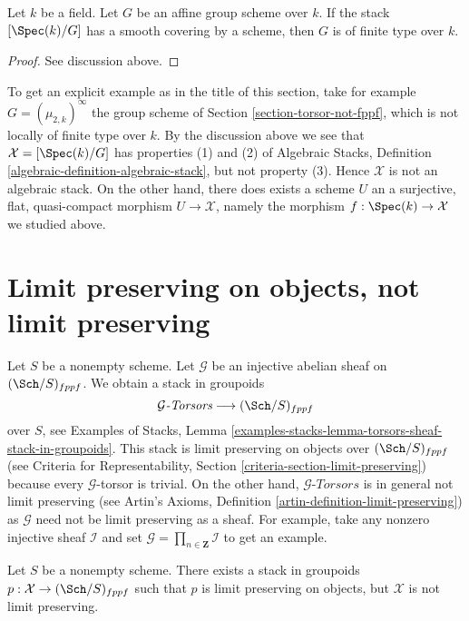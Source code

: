 \begin{lemma}
\label{lemma-BG-algebraic}
Let $k$ be a field. Let $G$ be an affine group scheme over $k$.
If the stack $[\Spec(k)/G]$ has a smooth covering by a
scheme, then $G$ is of finite type over $k$.
\end{lemma}

\begin{proof}
See discussion above.
\end{proof}

\noindent
To get an explicit example as in the title of this section, take for example
$G = (\mu_{2, k})^\infty$ the group scheme of
Section \ref{section-torsor-not-fppf}, which is not locally of finite type
over $k$. By the discussion above we see that
$\mathcal{X} = [\Spec(k)/G]$ has properties (1) and (2) of
Algebraic Stacks, Definition \ref{algebraic-definition-algebraic-stack},
but not property (3). Hence $\mathcal{X}$ is not an algebraic stack.
On the other hand, there does exists a scheme $U$ an a surjective,
flat, quasi-compact morphism $U \to \mathcal{X}$, namely the morphism
$f : \Spec(k) \to \mathcal{X}$ we studied above.






\section{Limit preserving on objects, not limit preserving}
\label{section-limit-preserving}

\noindent
Let $S$ be a nonempty scheme. Let $\mathcal{G}$ be an injective abelian sheaf
on $(\Sch/S)_{fppf}$. We obtain a stack in groupoids
$$
\mathcal{G}\textit{-Torsors} \longrightarrow (\Sch/S)_{fppf}
$$
over $S$, see Examples of Stacks, Lemma
\ref{examples-stacks-lemma-torsors-sheaf-stack-in-groupoids}.
This stack is limit preserving on objects over $(\Sch/S)_{fppf}$ (see
Criteria for Representability, Section \ref{criteria-section-limit-preserving})
because every $\mathcal{G}$-torsor is trivial. On the other hand,
$\mathcal{G}\textit{-Torsors}$ is in general not limit preserving (see
Artin's Axioms, Definition \ref{artin-definition-limit-preserving})
as $\mathcal{G}$ need not be limit preserving as a sheaf. For example,
take any nonzero injective sheaf $\mathcal{I}$ and set
$\mathcal{G} = \prod_{n \in \mathbf{Z}} \mathcal{I}$ to get an
example.

\begin{lemma}
\label{lemma-limit-preserving-on-objects-not-limit-preserving}
Let $S$ be a nonempty scheme. There exists a stack in groupoids
$p : \mathcal{X} \to (\Sch/S)_{fppf}$
such that $p$ is limit preserving on objects, but $\mathcal{X}$ is not
limit preserving.
\end{lemma}

